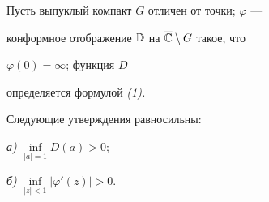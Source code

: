  


\begin{lem} Пусть выпуклый компакт $G$ отличен от точки; $\varphi$ --- 


конформное отображение $\Bbb D$ на $\overline{\Bbb C}\setminus G$ такое, что 


$\varphi(0)=\infty$; функция $D$ 


определяется формулой {\em (1).}


Следующие утверждения равносильны: 


 


{\em а)} $\inf\limits_{|a|=1}D(a)>0$; 


 


{\em б)} $\inf\limits_{|z|<1}|\varphi'(z)|>0$. 


\end{lem} 


 


